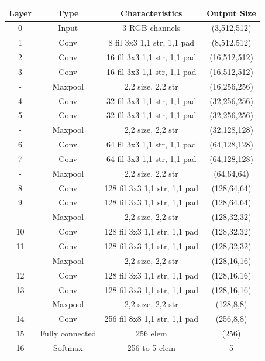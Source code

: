\documentclass[a0,portrait]{a0poster}
\begin{document}
\begin{multicols}{3}
\begin{center}
	\begin{tabular}{c c c c} 
		\hline
		Layer & Type & Characteristics & Output Size \\ [0.5ex] 
		\hline\hline
		0 & Input & 3 RGB channels & (3,512,512) \\ 
		1 & Conv & 8 fil 3x3 1,1 str, 1,1 pad & (8,512,512) \\
		2 & Conv & 16 fil 3x3 1,1 str, 1,1 pad & (16,512,512) \\
		3 & Conv & 16 fil 3x3 1,1 str, 1,1 pad & (16,512,512) \\
		- & Maxpool & 2,2 size, 2,2 str & (16,256,256) \\
		4 & Conv & 32 fil 3x3 1,1 str, 1,1 pad & (32,256,256) \\
		5 & Conv & 32 fil 3x3 1,1 str, 1,1 pad & (32,256,256) \\
		- & Maxpool & 2,2 size, 2,2 str & (32,128,128) \\
		6 & Conv & 64 fil 3x3 1,1 str, 1,1 pad & (64,128,128) \\
		7 & Conv & 64 fil 3x3 1,1 str, 1,1 pad & (64,128,128) \\
		- & Maxpool & 2,2 size, 2,2 str & (64,64,64) \\
		8 & Conv & 128 fil 3x3 1,1 str, 1,1 pad & (128,64,64) \\
		9 & Conv & 128 fil 3x3 1,1 str, 1,1 pad & (128,64,64) \\
		- & Maxpool & 2,2 size, 2,2 str & (128,32,32) \\
		10 & Conv & 128 fil 3x3 1,1 str, 1,1 pad & (128,32,32) \\
		11 & Conv & 128 fil 3x3 1,1 str, 1,1 pad & (128,32,32) \\
		- & Maxpool & 2,2 size, 2,2 str & (128,16,16) \\
		12 & Conv & 128 fil 3x3 1,1 str, 1,1 pad & (128,16,16) \\
		13 & Conv & 128 fil 3x3 1,1 str, 1,1 pad & (128,16,16) \\
		- & Maxpool & 2,2 size, 2,2 str & (128,8,8) \\
		14 & Conv & 256 fil 8x8 1,1 str, 1,1 pad & (256,8,8) \\
		15 & Fully connected & 256 elem & (256) \\ [1ex] 
		16 & Softmax & 256 to 5 elem & 5 \\ [1ex] 
		\hline
	\end{tabular}

	\label{table:best-nn}
\end{center}


\end{multicols}
\end{document}
